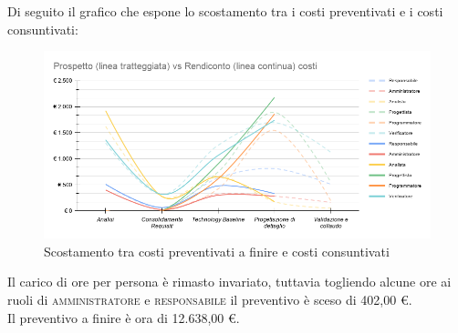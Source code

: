 \documentclass[../piano_di_progetto.tex]{subfiles}
\begin{document}
Di seguito il grafico che espone lo scostamento tra i costi preventivati e i costi consuntivati:

\begin{figure}[H]
	\centering
	\includegraphics[width=17cm]{src/img/report/prospetto_costi_totale}
	\caption{Scostamento tra costi preventivati a finire e costi consuntivati}
\end{figure}

\noindent Il carico di ore per persona è rimasto invariato, tuttavia togliendo alcune ore ai ruoli di \textsc{amministratore} e \textsc{responsabile} il preventivo è sceso di 402,00 €.\\
Il preventivo a finire è ora di 12.638,00 €. 
\end{document}
